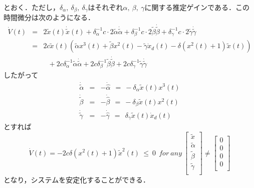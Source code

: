 \documentclass[a4paper,12pt]{jarticle}
\begin{document}
とおく．ただし，$ \delta_{\alpha}, ~ \delta_{\beta}, ~ \delta_{\gamma} $はそれぞれ$ \alpha, ~ \beta, ~ \gamma $に関する推定ゲインである．この時間微分は次のようになる．
\begin{eqnarray}
 \dot{V}(t) & = & 2 \tilde{x}(t) \dot{\tilde{x}}(t) + \delta_{\alpha}^{-1} c \cdot 2 \tilde{\alpha} \dot{\tilde{\alpha}} + \delta_{\beta}^{-1} c \cdot 2 \tilde{\beta} \dot{\tilde{\beta}} + \delta_{\gamma}^{-1} c \cdot 2 \tilde{\gamma} \dot{\tilde{\gamma}} \nonumber \\
            & = & 2 c \tilde{x}(t) \left( \tilde{\alpha}x^3(t) + \tilde{\beta}x^2(t) - \tilde{\gamma}\dot{x}_d(t) - \delta \left( x^2(t) + 1 \right) \tilde{x}(t) \right) \nonumber \\
            &   & ~~~ + 2c\delta_{\alpha}^{-1} \tilde{\alpha}\dot{\tilde{\alpha}} + 2c\delta_{\beta}^{-1} \tilde{\beta}\dot{\tilde{\beta}} + 2c\delta_{\gamma}^{-1} \tilde{\gamma}\dot{\tilde{\gamma}}
\end{eqnarray}
したがって
\begin{eqnarray}
  \dot{\tilde{\alpha}} & = & - \dot{\hat{\alpha}} ~~ = ~ - \delta_{\alpha}\tilde{x}(t)x^3(t)\\
  \dot{\tilde{\beta}} & = & - \dot{\hat{\beta}} ~~ = ~ - \delta_{\beta}\tilde{x}(t)x^2(t)\\
  \dot{\tilde{\gamma}} & = & - \dot{\hat{\gamma}} ~~ = ~~ \delta_{\gamma}\tilde{x}(t)\dot{x}_d(t)
\end{eqnarray}
とすれば
\begin{equation}
 \dot{V}(t) = -2c\delta\left( x^2(t) + 1 \right) \tilde{x}^2(t) ~ \leq ~ 0 ~~ for ~ any ~ \left[
											\begin{array}{c}
											 \tilde{x} \\
											 \tilde{\alpha} \\
											 \tilde{\beta} \\
											 \tilde{\gamma} \\
											\end{array}
											\right] \neq \left[
												     \begin{array}{c}
												      0\\
												      0\\
												      0\\
												      0\\
												     \end{array}
												     \right]
\end{equation}
となり，システムを安定化することができる．
\end{document}
